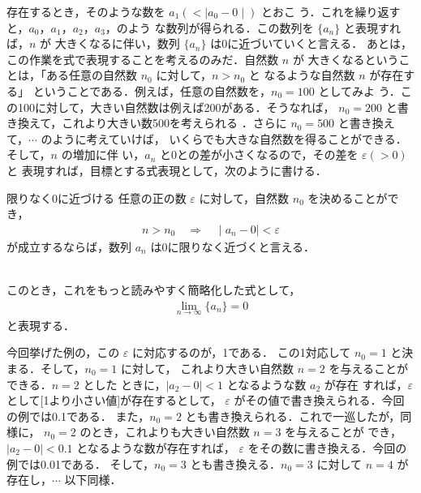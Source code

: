                 存在するとき，そのような数を $a_{1}(<\mid a_{0}-0 \mid)$ とおこ
                う．これを繰り返すと，$a_{0}$，$a_{1}$，$a_{2}$，$a_{3}$，のよう
                な数列が得られる．この数列を $\{ a_{n} \}$ と表現すれば，$n$ が
                大きくなるに伴い，数列 $\{ a_{n} \}$ は0に近づいていくと言える．
                あとは，この作業を式で表現することを考えるのみだ．自然数 $n$ が
                大きくなるということは，「ある任意の自然数 $n_{0}$ に対して，$n>n_{0}$ と
                なるような自然数 $n$ が存在する」
                ということである．例えば，任意の自然数を，$n_{0}=100$ としてみよ
                う．この100に対して，大きい自然数は例えば200がある．そうなれば，
                $n_{0}=200$ と書き換えて，これより大きい数500を考えられる
                ．さらに $n_{0}=500$ と書き換えて，$\cdots$ のように考えていけば，
                いくらでも大きな自然数を得ることができる．そして，$n$ の増加に伴
                い，$a_{n}$ と0との差が小さくなるので，その差を $\varepsilon (>0)$ と
                表現すれば，目標とする式表現として，次のように書ける．
                \\
                    \begin{itembox}[l]{限りなく0に近づける}
                        任意の正の数 $\varepsilon$ に対して，自然数 $n_{0}$ を決めることができ，
                            \begin{align}
                                n>n_{0} \quad\Rightarrow\quad \mid a_{n}-0 \mid <\varepsilon
                            \end{align}
                        が成立するならば，数列 $a_{n}$ は0に限りなく近づくと言える．
                    \end{itembox}
                    \\

                このとき，これをもっと読みやすく簡略化した式として，
                    \begin{align}
                        \lim_{n\rightarrow \infty } \{ a_{n} \} = 0
                    \end{align}
                と表現する．

                今回挙げた例の，この $\varepsilon$ に対応するのが，1である．
                この1対応して $n_{0}=1$ と決まる．そして，$n_{0}=1$ に対して，
                これより大きい自然数 $n=2$ を与えることができる．$n=2$ とした
                ときに，$\mid a_{2}-0 \mid < 1$ となるような数 $a_{2}$ が存在
                すれば，$\varepsilon$ として[1より小さい値]が存在するとして，
                $\varepsilon$ がその値で書き換えられる．今回の例では0.1である．
                また，$n_{0}=2$ とも書き換えられる．これで一巡したが，同様に，
                $n_{0}=2$ のとき，これよりも大きい自然数 $n=3$ を与えることが
                でき，$\mid a_{2}-0 \mid < 0.1$ となるような数が存在すれば，
                $\varepsilon$ をその数に書き換える．今回の例では0.01である．
                そして，$n_{0}=3$ とも書き換える．$n_{0}=3$ に対して $n=4$ が
                存在し，$\cdots$ 以下同様．

